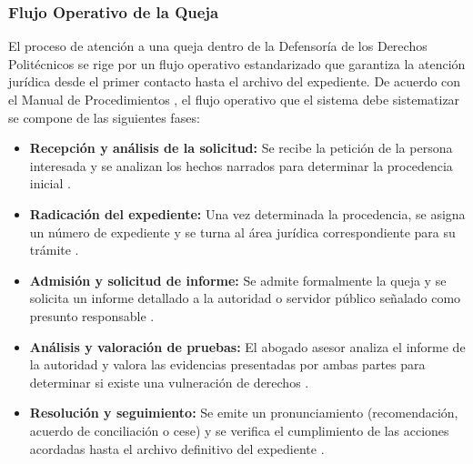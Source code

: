 \documentclass[12pt, letterpaper]{article}
\begin{document}
\subsubsection{Flujo Operativo de la Queja}
El proceso de atención a una queja dentro de la Defensoría de los Derechos Politécnicos se rige por un flujo operativo estandarizado que garantiza la atención jurídica desde el primer contacto hasta el archivo del expediente. De acuerdo con el Manual de Procedimientos \cite{ipn_manual_procedimientos}, el flujo operativo que el sistema debe sistematizar se compone de las siguientes fases:
\\
\begin{itemize}
    \item \textbf{Recepción y análisis de la solicitud:} Se recibe la petición de la persona interesada y se analizan los hechos narrados para determinar la procedencia inicial \cite{ipn_manual_procedimientos}. 
    \item \textbf{Radicación del expediente:} Una vez determinada la procedencia, se asigna un número de expediente y se turna al área jurídica correspondiente para su trámite \cite{ipn_manual_procedimientos}. 
    \item \textbf{Admisión y solicitud de informe:} Se admite formalmente la queja y se solicita un informe detallado a la autoridad o servidor público señalado como presunto responsable \cite{ipn_manual_procedimientos}. 
    \item \textbf{Análisis y valoración de pruebas:} El abogado asesor analiza el informe de la autoridad y valora las evidencias presentadas por ambas partes para determinar si existe una vulneración de derechos \cite{ipn_manual_procedimientos}. 
    \item \textbf{Resolución y seguimiento:} Se emite un pronunciamiento (recomendación, acuerdo de conciliación o cese) y se verifica el cumplimiento de las acciones acordadas hasta el archivo definitivo del expediente \cite{ipn_manual_procedimientos}.
\end{itemize}
\end{document}
